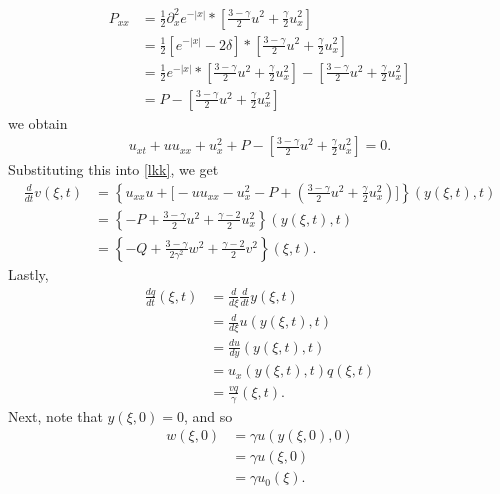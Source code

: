 \documentclass[12pt,reqno]{amsart}
\numberwithin{equation}{section}  %
\numberwithin{figure}{section}
\newcommand{\p}{\partial}
\begin{document}
\begin{equation*}
\begin{split}
P_{xx}
&  = \frac{1}{2} \p_{x}^{2}e^{-| x |}* \left [ \frac{3 - \gamma}{2}u^{2} + \frac{\gamma}{2} u_{x}^{2} \right ] 
\\
& = \frac{1}{2} \left [ e^{-| x |} - 2 \delta \right ] * \left [ \frac{3 - \gamma}{2}u^{2} + \frac{\gamma}{2} u_{x}^{2} \right ] 
\\
& = \frac{1}{2} e^{-| x |} * \left [ \frac{3 - \gamma}{2}u^{2} +
\frac{\gamma}{2} u_{x}^{2} \right ] - \left [ \frac{3 -
\gamma}{2}u^{2} + \frac{\gamma}{2} u_{x}^{2} \right ] 
\\
& = P - \left [ \frac{3 -
\gamma}{2}u^{2} + \frac{\gamma}{2} u_{x}^{2} \right ] 
\end{split}
\end{equation*}
%
%
we obtain
%
%
\begin{equation*}
\begin{split}
u_{xt} + u u_{xx} + u_{x}^{2} + P - \left [ \frac{3 -
\gamma}{2}u^{2} + \frac{\gamma}{2} u_{x}^{2} \right ]  = 0.
\end{split}
\end{equation*}
%
%
Substituting this into \eqref{lkk}, we get
%
%
\begin{equation*}
\begin{split}
\frac{d}{dt}v(\xi, t)
& = \left \{ u_{xx} u + \big[-uu_{xx} - u_{x}^{2} - P + \left ( \frac{3 - \gamma}{2} u^{2} + \frac{\gamma}{2}u_{x}^{2} \right ) ] \right \}(y(\xi, t), t)
\\
& = \left \{- P  + \frac{3 - \gamma}{2} u^{2} + \frac{\gamma-2}{2} u_{x}^{2} \right \}(y(\xi, t), t)
\\
& = \left \{-Q + \frac{3- \gamma}{2 \gamma^{2}}w^{2} + \frac{\gamma-2}{2}
v^{2} \right \}(\xi, t).
\end{split}
\end{equation*}
%
Lastly,
%
%
%
%
\begin{equation*}
\begin{split}
\frac{dq}{dt}(\xi, t)
& = \frac{d}{d\xi}\frac{d}{dt}y(\xi, t)
\\
& = \frac{d}{d \xi}u(y(\xi, t), t)
\\
& = \frac{du}{dy}(y(\xi,t),t)
\\
& = u_{x}(y(\xi, t), t)q(\xi, t)
\\
& = \frac{vq}{\gamma}(\xi,t).
\end{split}
\end{equation*}
%
%
Next, note that $y(\xi, 0) = 0$, and so
%
%
\begin{equation*}
\begin{split}
w(\xi, 0)
& = \gamma u(y(\xi, 0), 0)
\\
& = \gamma u(\xi, 0)
\\
& = \gamma u_{0}(\xi).
\end{split}
\end{equation*}
%
%
\end{document}
